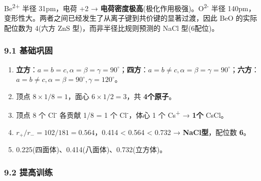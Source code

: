 Be\textsuperscript{2+} 半径 31pm，电荷 +2 → \textbf{电荷密度极高}(极化作用极强)。O\textsuperscript{2-} 半径 140pm，变形性大。两者之间已经发生了从离子键到共价键的显著过渡，因此 BeO 的实际配位数为 4(六方 ZnS 型)，而非半径比规则预测的 NaCl 型(6配位)。

\subsubsection{9.1 基础巩固}\label{ux57faux7840ux5de9ux56fa-1}

\begin{enumerate}
\def\labelenumi{\arabic{enumi}.}
\item
  \textbf{立方}：\(a=b=c, \alpha=\beta=\gamma=90^\circ\)；\textbf{四方}：\(a=b\neq c, \alpha=\beta=\gamma=90^\circ\)；\textbf{六方}：\(a=b\neq c, \alpha=\beta=90^\circ, \gamma=120^\circ\)。
\item
  顶点 \(8 \times 1/8 = 1\)，面心 \(6 \times 1/2 = 3\)，共 \textbf{4个原子}。
\item
  顶点 8 个 Cl\textsuperscript{-} 各贡献 1/8 = 1 个 Cl\textsuperscript{-}，体心 1 个 Cs\textsuperscript{+} → \textbf{1个} CsCl。
\item
  \(r_+/r_- = 102/181 = 0.564\)，0.414 \textless{} 0.564 \textless{} 0.732 → \textbf{NaCl型}，配位数 \textbf{6}。
\item
  0.225(四面体)、0.414(八面体)、0.732(立方体)。
\end{enumerate}

\subsubsection{9.2 提高训练}\label{ux63d0ux9ad8ux8badux7ec3-1}

